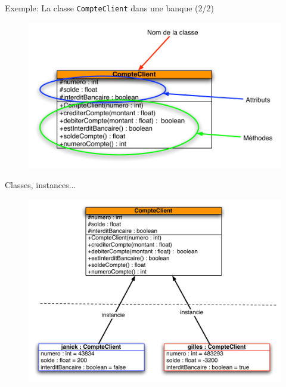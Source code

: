 \begin{frame}{Exemple: La classe {\tt CompteClient} dans une banque (2/2)}
  \begin{figure}[htbp]
    \begin{center}
      \includegraphics[scale=.4]{fig/CompteClientExplique.pdf}
    \end{center}
  \end{figure}

\end{frame}

\begin{frame}{Classes, instances...}
  \begin{figure}[htbp]
    \begin{center}
      \includegraphics[scale=0.4]{fig/CompteClientInstance.pdf}
    \end{center}
  \end{figure}
\end{frame}

